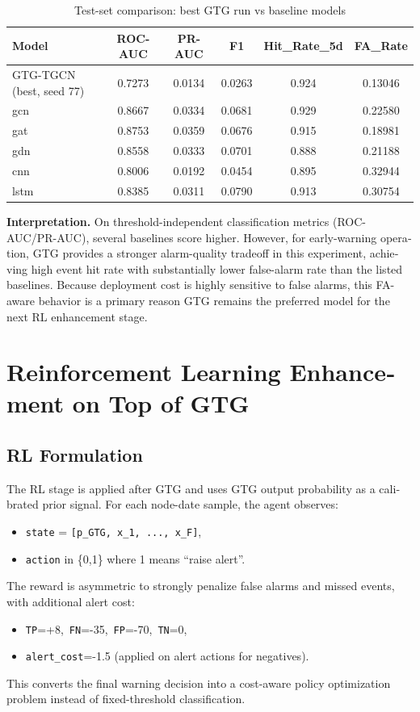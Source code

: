 \documentclass[12pt,a4paper]{article}
\begin{document}
\begin{latin}
\begin{table}[H]
\centering
\caption{Test-set comparison: best GTG run vs baseline models}
\label{tab:model_compare}
\begin{tabular}{lccccc}
\toprule
Model & ROC-AUC & PR-AUC & F1 & Hit\_Rate\_5d & FA\_Rate \\
\midrule
GTG-TGCN (best, seed 77) & 0.7273 & 0.0134 & 0.0263 & 0.924 & 0.13046 \\
gcn & 0.8667 & 0.0334 & 0.0681 & 0.929 & 0.22580 \\
gat & 0.8753 & 0.0359 & 0.0676 & 0.915 & 0.18981 \\
gdn & 0.8558 & 0.0333 & 0.0701 & 0.888 & 0.21188 \\
cnn & 0.8006 & 0.0192 & 0.0454 & 0.895 & 0.32944 \\
lstm & 0.8385 & 0.0311 & 0.0790 & 0.913 & 0.30754 \\
\bottomrule
\end{tabular}
\end{table}

\noindent\textbf{Interpretation.}
On threshold-independent classification metrics (ROC-AUC/PR-AUC), several baselines score higher.
However, for early-warning operation, GTG provides a stronger alarm-quality tradeoff in this experiment, achieving high event hit rate with substantially lower false-alarm rate than the listed baselines.
Because deployment cost is highly sensitive to false alarms, this FA-aware behavior is a primary reason GTG remains the preferred model for the next RL enhancement stage.

\section{Reinforcement Learning Enhancement on Top of GTG}

\subsection{RL Formulation}
The RL stage is applied after GTG and uses GTG output probability as a calibrated prior signal.
For each node-date sample, the agent observes:
\begin{itemize}
\item \texttt{state} = \texttt{[p\_GTG, x\_1, ..., x\_F]},
\item \texttt{action} in \{0,1\} where 1 means ``raise alert''.
\end{itemize}

The reward is asymmetric to strongly penalize false alarms and missed events, with additional alert cost:
\begin{itemize}
\item \texttt{TP}=+8,\ \texttt{FN}=-35,\ \texttt{FP}=-70,\ \texttt{TN}=0,
\item \texttt{alert\_cost}=-1.5 (applied on alert actions for negatives).
\end{itemize}
This converts the final warning decision into a cost-aware policy optimization problem instead of fixed-threshold classification.


\end{latin}
\end{document}
